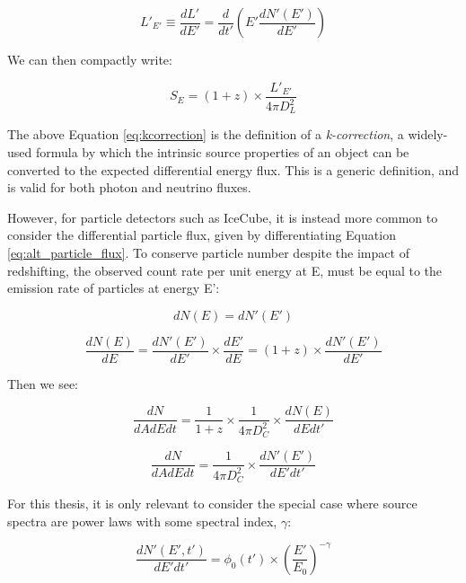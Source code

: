 \begin{equation}
L'_{E'} \equiv  \frac{dL'}{dE'} = \frac{d}{dt'} \left( E' \frac{dN'(E')}{dE'} \right)
\end{equation}

We can then compactly write:

\begin{equation}
S_{E} = (1+z) \times \frac{L'_{E'}}{4 \pi D_{L}^{2}}
\label{eq:kcorrection}
\end{equation}

The above Equation \ref{eq:kcorrection} is the definition of a \emph{k-correction}, a widely-used formula by which the intrinsic source properties of an object can be converted to the expected differential energy flux. This is a generic definition, and is valid for both photon and neutrino fluxes. 

However, for particle detectors such as IceCube, it is instead more common to consider the differential particle flux, given by differentiating Equation \ref{eq:alt_particle_flux}. To conserve particle number despite the impact of redshifting, the observed count rate per unit energy at E, must be equal to the emission rate of particles at energy E':

\begin{equation}
dN(E) = dN'(E')
\end{equation}

\begin{equation}
\frac{dN(E)}{dE} = \frac{dN'(E')}{dE'} \times \frac{dE'}{dE} = (1+z) \times \frac{dN'(E')}{dE'}
\end{equation}

Then we see:

\begin{equation}
\frac{dN}{dAdE dt} = \frac{1}{1+z} \times \frac{1}{4 \pi D_{C}^{2}} \times \frac{dN(E)}{dEdt'}
\end{equation}

\begin{equation}
\frac{dN}{dAdEdt}= \frac{1}{4 \pi D_{C}^{2}} \times \frac{dN'(E')}{dE'dt'}
\end{equation}

For this thesis, it is only relevant to consider the special case where source spectra are power laws with some spectral index, $\gamma$:

\begin{equation}
\frac{dN'(E', t')}{dE'dt'} = \phi_{0}(t') \times \left( \frac{E'}{E_{0}}\right) ^{-\gamma}
\label{eq:def_pl}
\end{equation}

